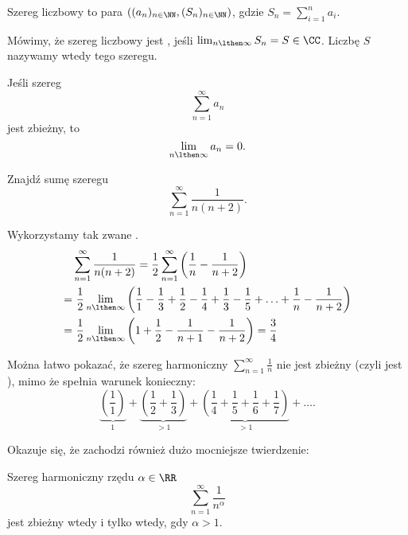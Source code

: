\begin{definition}
    Szereg liczbowy to para $((a_n)_{n\in\NN}, (S_n)_{n\in\NN})$, gdzie $S_n = \sum_{i=1}^n a_i$.
\end{definition}

Mówimy, że szereg liczbowy jest , jeśli $\lim_{n\lthen\infty} S_n = S \in \CC$. Liczbę $S$ nazywamy wtedy  tego szeregu.

\begin{theorem}
    \label{t:necessary condition of convergence}
    Jeśli szereg
    \[ \sum_{n = 1}^\infty a_n \]
    jest zbieżny, to
    \[ \lim_{n\lthen\infty} a_n = 0. \]
\end{theorem}

\begin{example}
    Znajdź sumę szeregu
    \[ \sum_{n=1}^\infty \frac{1}{n(n+2)}. \]
\end{example}
\begin{solution}
    Wykorzystamy tak zwane .
    \begin{align*}
        &\sum_{n=1}^\infty \frac{1}{n(n+2)} = \frac{1}{2}\sum_{n=1}^\infty \left(\frac{1}{n} - \frac{1}{n+2}\right) \\
        =&\ \frac{1}{2}\lim_{n\lthen\infty}\left(\frac{1}{1} - \frac{1}{3} + \frac{1}{2} - \frac{1}{4} + \frac{1}{3} - \frac{1}{5} + \ldots + \frac{1}{n} - \frac{1}{n+2}\right) \\
        =&\ \frac{1}{2}\lim_{n\lthen\infty}\left(1 + \frac{1}{2} - \frac{1}{n+1} - \frac{1}{n+2}\right) = \frac{3}{4}
    \end{align*}
\end{solution}

Można łatwo pokazać, że szereg harmoniczny $\sum_{n=1}^\infty \frac{1}{n}$ nie jest zbieżny (czyli jest ), mimo że spełnia warunek konieczny:
\[ \underbrace{\left(\frac{1}{1}\right)}_1 + \underbrace{\left(\frac{1}{2} + \frac{1}{3}\right)}_{>1} + \underbrace{\left(\frac{1}{4} + \frac{1}{5} + \frac{1}{6} + \frac{1}{7}\right)}_{>1} + \ldots .\]

Okazuje się, że zachodzi również dużo mocniejsze twierdzenie:
\begin{theorem}
    \label{t:harmonic series}
    Szereg harmoniczny rzędu $\alpha \in \RR$
    \[ \sum_{n=1}^\infty \frac{1}{n^\alpha} \]
    jest zbieżny wtedy i tylko wtedy, gdy $\alpha > 1$.
\end{theorem}

